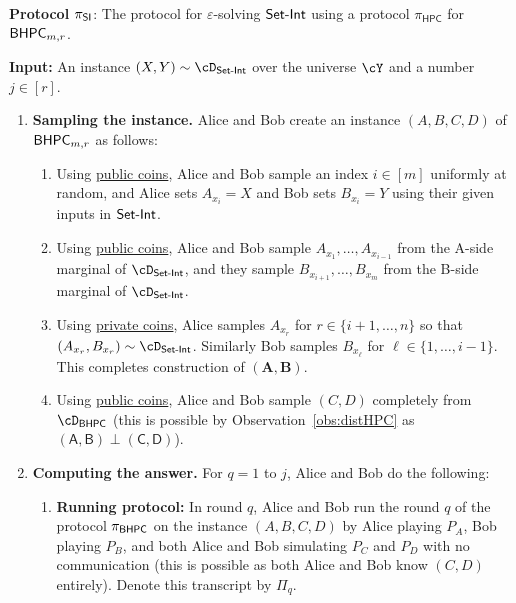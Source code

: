 \documentclass[11pt,letterpaper]{article}
\newcommand{\eps}{\varepsilon}
\newcommand{\HPC}{\mathsf{HPC}}
\theoremstyle{definition}
\newcommand{\dsi}{\cD_\SI}
\newcommand{\bhpc}{\ensuremath{\textnormal{\textsf{BHPC}}}\xspace}
\newenvironment{tbox}{\begin{tcolorbox}[
		enlarge top by=5pt,
		enlarge bottom by=5pt,
		 breakable,
		 boxsep=0pt,
                  left=4pt,
                  right=4pt,
                  top=10pt,
                  boxrule=1pt,toprule=1pt,
                  colback=white,
                  arc=-1pt,
                  ]%
	}
{\end{tcolorbox}}
\newcommand{\prot}{\ensuremath{\pi}}
\newcommand{\bA}{\bm{A}}
\newcommand{\bB}{\ensuremath{\bm{B}}}
\newcommand{\rA}{\rv{A}}
\newcommand{\rB}{\rv{B}}
\newcommand{\rC}{\rv{C}}
\newcommand{\rD}{\rv{D}}
\newcommand{\rv}[1]{\ensuremath{\mathsf{#1}}}
\newcommand{\protHPC}{\ensuremath{\prot_{\HPC}}}
\newcommand{\protSI}{\ensuremath{\prot}_{\ensuremath{\textnormal{\textsf{SI}}}}\xspace}
\newcommand{\SI}{\ensuremath{\textnormal{\textsf{Set-Int}}}\xspace}
\begin{document}
	\begin{tbox}
    \textbf{Protocol $\protSI$}: The protocol for $\eps$-solving $\SI$ using a protocol $\protHPC$ for $\bhpc_{m,r}$. 
    
     \smallskip
    
    \textbf{Input:} An instance $(X, Y) \sim \dsi$ over the universe $\cY$ and
    a number $j \in [r]$.
    
    
    \begin{enumerate}
    	\item \textbf{Sampling the instance.} Alice and Bob create an instance
        $(A, B, C, D)$ of $\bhpc_{m,r}$ as follows: %
	\begin{enumerate}
	\item Using \underline{public coins}, Alice and Bob sample an index $i \in [m]$ uniformly at random, and  
	Alice sets $A_{x_i} = X$ and Bob sets $B_{x_i} = Y$ using their given inputs in $\SI$. 
	\item Using \underline{public coins}, Alice and Bob sample $A_{x_1}, \ldots, A_{x_{i-1}}$ from the A-side marginal of $\cD_\SI$, and they sample $B_{x_{i+1}}, \ldots, B_{x_{m}}$ from the B-side marginal of $\cD_\SI$. 
	\item Using \underline{private coins}, Alice samples $A_{x_r}$ for $r \in \{i+1, \ldots, n\}$ so that $(A_{x_r},B_{x_r}) \sim \cD_\SI$. Similarly Bob samples $B_{x_\ell}$ for $\ell \in \{1, \ldots, i-1\}$. This completes construction of $(\bA,\bB)$. 
  \item Using \underline{public coins}, Alice and Bob sample $(C, D)$ completely
    from $\cD_\bhpc$ (this is possible by Observation~\ref{obs:distHPC} as
    $(\rA, \rB) \perp (\rC, \rD)$). 
        \end{enumerate}
  
        
           \item\label{line:AB} \textbf{Computing the answer.} 
          For $q = 1$ to $j$, Alice and Bob do the following: \begin{enumerate}
              \item \textbf{Running protocol:} In round $q$, Alice and Bob run
                the round $q$ of the protocol $\prot_\bhpc$ on the instance $(A,
                B, C, D)$ by Alice playing $P_A$, Bob playing $P_B$, and both
                Alice and Bob simulating $P_C$ and $P_D$ with no communication
                (this is possible as both Alice and Bob know $(C, D)$ entirely).
                Denote this transcript by $\Pi_q$.


\end{enumerate}
\end{enumerate}
\end{tbox}
\end{document}
